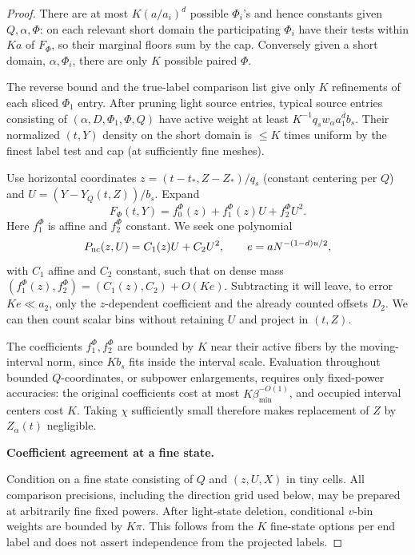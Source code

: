 \begin{proof}
There are at most \(K(a/a_i)^d\) possible \(\Phi_i\)'s and
hence constants given \(Q,\alpha,\Phi\): on each relevant short
domain the participating \(\Phi_i\) have their tests within
\(K a\) of \(F_\Phi\), so their marginal floors sum by the cap.
Conversely given a short domain, \(\alpha,\Phi_i\), there are
only \(K\) possible paired \(\Phi\).

The reverse bound and the true-label comparison list give only
\(K\) refinements of each sliced \(\Phi_1\) entry. After pruning
light source entries, typical source entries consisting of
\((\alpha,D,\Phi_1,\Phi,Q)\) have active weight at least
\(K^{-1} q_s w_\alpha a_1^d b_s\). Their normalized \((t,Y)\)
density on the short domain is \(\le K\) times uniform by the
finest label test and cap (at sufficiently fine meshes).

Use horizontal coordinates \(z=(t-t_*,Z-Z_*)/q_s\) (constant centering per \(Q\)) and \(U=(Y-Y_Q(t,Z))/b_s\). Expand
\[
 F_\Phi(t,Y)=f_0^\Phi(z)+f_1^\Phi(z)U+f_2^\Phi U^2 .
\]
Here \(f_1^\Phi\) is affine and \(f_2^\Phi\) constant. We seek
one polynomial
\[
 P_{\rm nc}(z,U)=C_1(z)U+C_2U^2,
 \qquad e=aN^{-(1-d)u/2},
\]
with \(C_1\) affine and \(C_2\) constant, such that on dense mass
\((f_1^\Phi(z),f_2^\Phi)=(C_1(z),C_2)+O(Ke)\).
Subtracting it will leave, to error \(Ke\ll a_2\), only the
\(z\)-dependent coefficient and the already counted offsets
\(D_2\). We can then count scalar bins without retaining \(U\)
and project in \((t,Z)\).

The coefficients \(f_1^\Phi,f_2^\Phi\) are bounded by \(K\)
near their active fibers by the moving-interval norm, since
\(Kb_s\) fits inside the interval scale. Evaluation throughout
bounded \(Q\)-coordinates, or subpower enlargements, requires only
fixed-power accuracies: the original coefficients cost at most
\(K\beta_{\min}^{-O(1)}\), and occupied interval centers cost
\(K\). Taking \(\chi\) sufficiently small therefore makes
replacement of \(Z\) by \(Z_\alpha(t)\) negligible.

\par\smallskip\noindent\textbf{Coefficient agreement at a fine state.}\quad

Condition on a fine state consisting of \(Q\) and \((z,U,X)\)
in tiny cells. All comparison precisions, including the direction
grid used below, may be prepared at arbitrarily fine fixed powers.
After light-state deletion, conditional \(v\)-bin weights are
bounded by \(K\pi\). This follows from the \(K\) fine-state
options per end label and does not assert independence from the
projected labels.


\end{proof}
